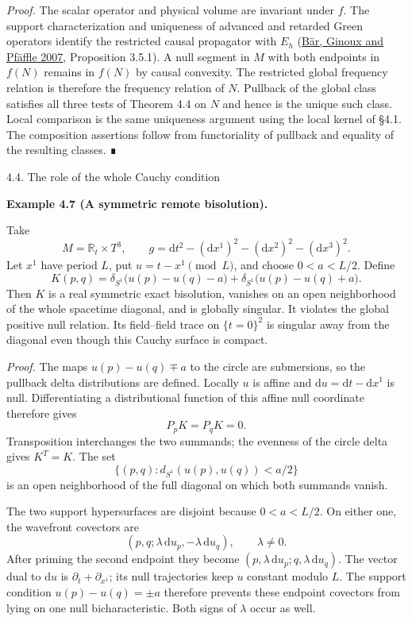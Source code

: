 \documentclass[
  english,
  11pt,
  reqno]{amsart}
\makeatletter
\newcommand{\paperstatementsection}{\@startsection{subsection}{2}%
  \z@{.5\linespacing\@plus.7\linespacing}{.35\baselineskip}%
  {\normalfont\bfseries}}
\newcommand{\paperfirststatement}[1]{%
  {\normalfont\bfseries #1\par}%
  \nobreak\@afterindenttrue\@afterheading}
\makeatother
\begin{document}
\emph{Proof.} The scalar operator and physical volume are invariant
under \(f\). The support characterization and uniqueness of advanced and
retarded Green operators identify the restricted causal propagator with
\(E_h\) (\hyperref[ref-BarGinouxPfaeffle2007]{Bär, Ginoux and Pfäffle
2007}, Proposition 3.5.1). A null segment in \(M\) with both endpoints
in \(f(N)\) remains in \(f(N)\) by causal convexity. The restricted
global frequency relation is therefore the frequency relation of \(N\).
Pullback of the global class satisfies all three tests of Theorem 4.4 on
\(N\) and hence is the unique such class. Local comparison is the same
uniqueness argument using the local kernel of §4.1. The composition
assertions follow from functoriality of pullback and equality of the
resulting classes. ∎

\protect{}\label{sec:whole-cauchy-condition}
\paperstatementsection{4.4. The role of the whole Cauchy
condition}\label{the-role-of-the-whole-cauchy-condition}
\paperfirststatement{\protect{}\label{ex:torus-remote-bisolution}Example 4.7 (A symmetric remote bisolution).}

Take \[
M=\mathbb R_t\times T^3,\qquad
g=\mathrm dt^2-(\mathrm dx^1)^2-(\mathrm dx^2)^2-(\mathrm dx^3)^2.
\] Let \(x^1\) have period \(L\), put \(u=t-x^1\pmod L\), and choose
\(0<a<L/2\). Define \[
K(p,q)=
\delta_{S^1}\bigl(u(p)-u(q)-a\bigr)
+\delta_{S^1}\bigl(u(p)-u(q)+a\bigr).
\] Then \(K\) is a real symmetric exact bisolution, vanishes on an open
neighborhood of the whole spacetime diagonal, and is globally singular.
It violates the global positive null relation. Its field--field trace on
\(\{t=0\}^2\) is singular away from the diagonal even though this Cauchy
surface is compact.

\emph{Proof.} The maps \(u(p)-u(q)\mp a\) to the circle are submersions,
so the pullback delta distributions are defined. Locally \(u\) is affine
and \(\mathrm du=\mathrm dt-\mathrm dx^1\) is null. Differentiating a
distributional function of this affine null coordinate therefore gives
\[
P_pK=P_qK=0.
\] Transposition interchanges the two summands; the evenness of the
circle delta gives \(K^T=K\). The set \[
\{(p,q):d_{S^1}(u(p),u(q))<a/2\}
\] is an open neighborhood of the full diagonal on which both summands
vanish.

The two support hypersurfaces are disjoint because \(0<a<L/2\). On
either one, the wavefront covectors are \[
(p,q;\lambda\,\mathrm du_p,-\lambda\,\mathrm du_q),
\qquad\lambda\ne0.
\] After priming the second endpoint they become
\((p,\lambda\,\mathrm du_p;q,\lambda\,\mathrm du_q)\). The vector dual
to \(\mathrm du\) is \(\partial_t+\partial_{x^1}\); its null
trajectories keep \(u\) constant modulo \(L\). The support condition
\(u(p)-u(q)=\pm a\) therefore prevents these endpoint covectors from
lying on one null bicharacteristic. Both signs of \(\lambda\) occur as
well.
\end{document}
